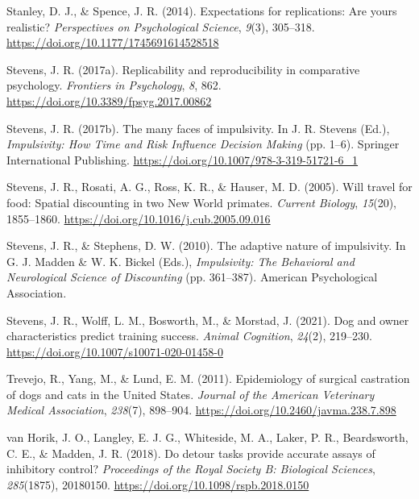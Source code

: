\documentclass[
  pub,floatsintext]{apa6}
\newlength{\cslhangindent}
\newlength{\cslentryspacingunit} %
\newenvironment{CSLReferences}[2] %
 {%
  \setlength{\parindent}{0pt}
  \ifodd #1
  \let\oldpar\par
  \def\par{\hangindent=\cslhangindent\oldpar}
  \fi
  \setlength{\parskip}{#2\cslentryspacingunit}
 }%
 {}
\begin{document}
\begin{CSLReferences}{1}{0}
\leavevmode{}%
Stanley, D. J., \& Spence, J. R. (2014). Expectations for replications: {Are} yours realistic? \emph{Perspectives on Psychological Science}, \emph{9}(3), 305--318. \url{https://doi.org/10.1177/1745691614528518}

\leavevmode{}%
Stevens, J. R. (2017a). Replicability and reproducibility in comparative psychology. \emph{Frontiers in Psychology}, \emph{8}, 862. \url{https://doi.org/10.3389/fpsyg.2017.00862}

\leavevmode{}%
Stevens, J. R. (2017b). The many faces of impulsivity. In J. R. Stevens (Ed.), \emph{Impulsivity: {How Time} and {Risk Influence Decision Making}} (pp. 1--6). {Springer International Publishing}. \url{https://doi.org/10.1007/978-3-319-51721-6_1}

\leavevmode{}%
Stevens, J. R., Rosati, A. G., Ross, K. R., \& Hauser, M. D. (2005). Will travel for food: Spatial discounting in two {New World} primates. \emph{Current Biology}, \emph{15}(20), 1855--1860. \url{https://doi.org/10.1016/j.cub.2005.09.016}

\leavevmode{}%
Stevens, J. R., \& Stephens, D. W. (2010). The adaptive nature of impulsivity. In G. J. Madden \& W. K. Bickel (Eds.), \emph{Impulsivity: {The Behavioral} and {Neurological Science} of {Discounting}} (pp. 361--387). {American Psychological Association}.

\leavevmode{}%
Stevens, J. R., Wolff, L. M., Bosworth, M., \& Morstad, J. (2021). Dog and owner characteristics predict training success. \emph{Animal Cognition}, \emph{24}(2), 219--230. \url{https://doi.org/10.1007/s10071-020-01458-0}

\leavevmode{}%
Trevejo, R., Yang, M., \& Lund, E. M. (2011). Epidemiology of surgical castration of dogs and cats in the {United States}. \emph{Journal of the American Veterinary Medical Association}, \emph{238}(7), 898--904. \url{https://doi.org/10.2460/javma.238.7.898}

\leavevmode{}%
van Horik, J. O., Langley, E. J. G., Whiteside, M. A., Laker, P. R., Beardsworth, C. E., \& Madden, J. R. (2018). Do detour tasks provide accurate assays of inhibitory control? \emph{Proceedings of the Royal Society B: Biological Sciences}, \emph{285}(1875), 20180150. \url{https://doi.org/10.1098/rspb.2018.0150}


\end{CSLReferences}
\end{document}
